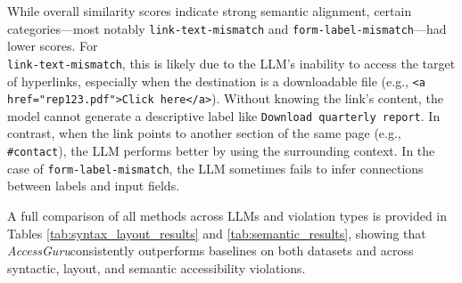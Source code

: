 \documentclass[sigconf, nonacm]{acmart}
\newcommand{\method}{\emph{AccessGuru}}
\begin{document}
While overall similarity scores indicate strong semantic alignment, certain categories—most notably \texttt{link-text-mismatch} and \texttt{form-label-mismatch}—had lower scores. For \\ \texttt{link-text-mismatch}, this is likely due to the LLM’s inability to access the target of hyperlinks, especially when the destination is a downloadable file (e.g., \texttt{<a href="rep123.pdf">Click here</a>}). Without knowing the link's content, the model cannot generate a descriptive label like \texttt{Download quarterly report}. In contrast, when the link points to another section of the same page (e.g., \texttt{\#contact}), the LLM performs better by using the surrounding context. In the case of \texttt{form-label-mismatch}, the LLM sometimes fails to infer connections between labels and input fields.






A full comparison of all methods across LLMs and violation types is provided in Tables \ref{tab:syntax_layout_results} and \ref{tab:semantic_results}, showing that \method \space consistently outperforms baselines on both datasets and across syntactic, layout, and semantic accessibility violations.
 
\renewcommand{\arraystretch}{1.3}
\end{document}
